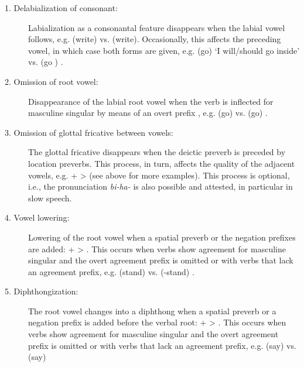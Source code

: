 \begin{description}
\item[1. Delabialization of consonant:] Labialization as a consonantal feature disappears when the labial vowel  follows, e.g.  (write) vs.  (write). Occasionally, this affects the preceding vowel, in which case both forms are given, e.g.  (go) `I will\slash should go inside' vs.  (go ) .

\item[2. Omission of root vowel:] Disappearance of the labial root vowel when the verb is inflected for masculine singular by means of an overt prefix , e.g.  (go)  vs.  (go) .

\item[3. Omission of glottal fricative between vowels:] The glottal fricative disappears when the deictic preverb  is preceded by location preverbs. This process, in turn, affects the quality of the adjacent vowels, e.g.  +  >  (see  above for more examples). This process is optional, i.e., the pronunciation \textit{bi-ha-} is also possible and attested, in particular in slow speech.

\item[4. Vowel lowering:] Lowering of the root vowel  when a spatial preverb  or the negation prefixes  are added:  +  > . This occurs when verbs show agreement for masculine singular and the overt agreement prefix is omitted or with verbs that lack an agreement prefix, e.g.  (stand)  vs.  (-stand) .

\item[5. Diphthongization:] The root vowel  changes into a diphthong when a spatial preverb  or a negation prefix  is added before the verbal root:  +  > . This occurs when verbs show agreement for masculine singular and the overt agreement prefix is omitted or with verbs that lack an agreement prefix, e.g.  (say)  vs.  (say) 


\end{description}
